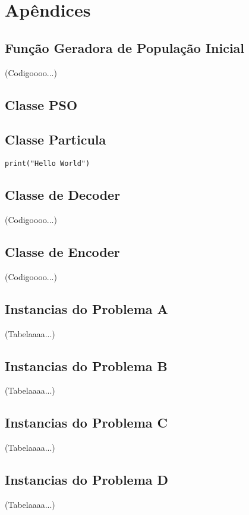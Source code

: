 \chapter{Apêndices}

\appendix

\section{Função Geradora de População Inicial}
\label{apd:fun-gen-init-pop}
    (Codigoooo...)


\section{Classe PSO}
\label{apd:pso-class}


\section{Classe Particula}
\label{apd:particule-class}
%
%
\begin{verbatim}
print("Hello World")
\end{verbatim}


\section{Classe de Decoder}
\label{apd:decode-class}
    (Codigoooo...)

\section{Classe de Encoder}
\label{apd:encode-class}
    (Codigoooo...)

\section{Instancias do Problema A}
\label{apd:problem-instance-a}
    (Tabelaaaa...)
\section{Instancias do Problema B}
\label{apd:problem-instance-b}
    (Tabelaaaa...)
\section{Instancias do Problema C}
\label{apd:problem-instance-c}
    (Tabelaaaa...)
\section{Instancias do Problema D}
\label{apd:problem-instance-d}
    (Tabelaaaa...)


